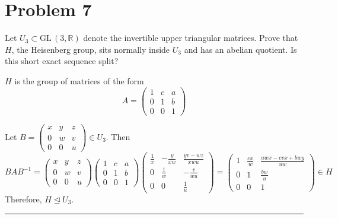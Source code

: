 \documentclass[12pt]{article}
\newcommand{\R}{\mathbb{R}}
\newcommand{\GL}{\text{GL}\,}
\begin{document}
\pagebreak
\section*{Problem 7}
Let $U_{3} \subset \GL(3,\R)$ denote the invertible upper triangular matrices.  Prove that $H$, the Heisenberg group, sits normally inside $U_{3}$ and has an abelian quotient.  Is this short exact sequence split?

    \color{blue}
        $H$ is the group of matrices of the form 
        \[A = \begin{pmatrix}
            1 & c & a\\
            0 & 1 & b\\
            0 & 0 & 1
        \end{pmatrix}\]

        Let $B = \begin{pmatrix}
            x & y & z\\ 
            0 & w & v\\ 
            0 & 0 & u
        \end{pmatrix} \in U_3$. Then 
        \[BAB^{-1} = \begin{pmatrix}
            x & y & z\\ 
            0 & w & v\\ 
            0 & 0 & u
        \end{pmatrix}\begin{pmatrix}
            1 & c & a\\
            0 & 1 & b\\
            0 & 0 & 1
        \end{pmatrix}\begin{pmatrix}
            \frac{1}{x} & -\frac{y}{xw} & \frac{yv - wz}{xwu}\\
            0 & \frac{1}{w} & -\frac{v}{wu}\\
            0 & 0 & \frac{1}{u}
        \end{pmatrix} = \begin{pmatrix}
            1 & \frac{cx}{w} & \frac{awx - cvx + bwy}{uw}\\ 
            0 & 1 & \frac{bw}{u}\\
            0 & 0 & 1
        \end{pmatrix} \in H\]
        Therefore, $H \trianglelefteq U_3$. 

        \vspace*{10pt}
        \hrule 
        \vspace*{10pt}
\end{document}

